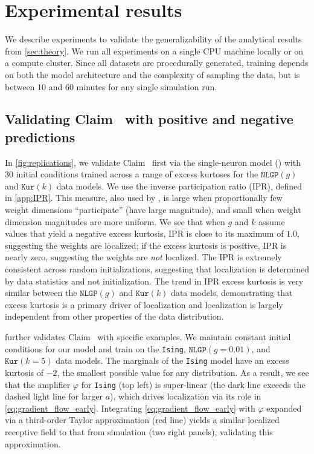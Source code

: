 \section{Experimental results}
\label{sec:experiments}

We describe experiments to validate the generalizability of the analytical results from \cref{sec:theory}.
We run all experiments on a single CPU machine locally or on a compute cluster. 
Since all datasets are procedurally generated, training depends on both the model architecture and the complexity of sampling the data, 
but is between 10 and 60 minutes for any single simulation run.

\subsection{Validating Claim~ with positive and negative predictions}
\label{sec:theory-validation}


In \cref{fig:replications}, we validate Claim~ first via the single-neuron model () with 30 initial conditions trained across a range of excess kurtoses for the $\texttt{NLGP}(g)$ and $\texttt{Kur}(k)$ data models.
We use the inverse participation ratio (IPR), defined in \cref{app:IPR}.
This measure, also used by \textcite{ingrosso2022data}, is large when proportionally few weight dimensions ``participate'' (have large magnitude), and small when weight dimension magnitudes are more uniform.
We see that when $g$ and $k$ assume values that yield a negative excess kurtosis, IPR is close to its maximum of $1.0$, suggesting the weights are localized; if the excess kurtosis is positive, IPR is nearly zero, suggesting the weights are \emph{not} localized.
The IPR is extremely consistent across random initializations, suggesting that localization is determined by data statistics and not initialization.
The trend in IPR \vs excess kurtosis is very similar between the $\texttt{NLGP}(g)$ and $\texttt{Kur}(k)$ data models, demonstrating that excess kurtosis is a primary driver of localization and localization is largely independent from other properties of the data distribution.


 further validates Claim~ with specific examples.
We maintain constant initial conditions for our model and train on the \texttt{Ising}, $\texttt{NLGP}(g=0.01)$, and $\texttt{Kur}(k=5)$ data models.
The marginals of the \texttt{Ising} model have an excess kurtosis of $-2$, the smallest possible value for any distribution.
As a result, we see that the amplifier $\varphi$ for \texttt{Ising} (top left) is super-linear (the dark line exceeds the dashed light line for larger $a$), which drives localization via its role in \cref{eq:gradient_flow_early}.
Integrating \cref{eq:gradient_flow_early} with $\varphi$ expanded via a third-order Taylor approximation (red line) yields a similar localized receptive field to that from simulation (two right panels), validating this approximation.

